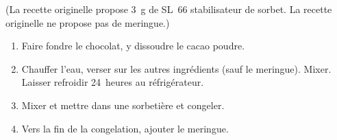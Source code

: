 
\begin{ingredients}
\end{ingredients}

(La recette originelle propose 3~g de SL~66 stabilisateur de sorbet.
La recette originelle ne propose pas de meringue.)


\begin{recipe}
  \begin{enumerate}

  \item Faire fondre le chocolat, y dissoudre le cacao poudre.

  \item Chauffer l'eau, verser sur les autres ingrédients (sauf le
    meringue).  Mixer.  Laisser refroidir 24~heures au réfrigérateur.

  \item Mixer et mettre dans une sorbetière et congeler.

  \item Vers la fin de la congelation, ajouter le meringue.

  \end{enumerate}
\end{recipe}

